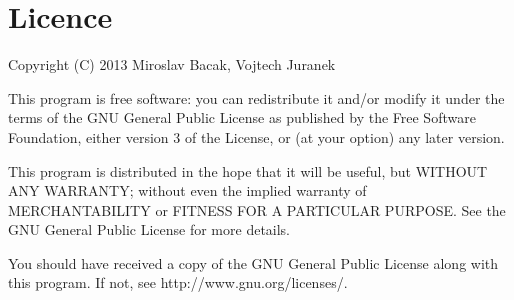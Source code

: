 \documentclass[a4paper,12pt]{amsart}
\begin{document}



\section{Licence}
Copyright (C) 2013 Miroslav Bacak, Vojtech Juranek

This program is free software: you can redistribute it and/or modify it under the terms of the GNU General Public License as published by the Free Software Foundation, either version 3 of the License, or (at your option) any later version.

This program is distributed in the hope that it will be useful, but WITHOUT ANY WARRANTY; without even the implied warranty of MERCHANTABILITY or FITNESS FOR A PARTICULAR PURPOSE.  See the GNU General Public License for more details.

You should have received a copy of the GNU General Public License along with this program.  If not, see http://www.gnu.org/licenses/.




\end{document}
